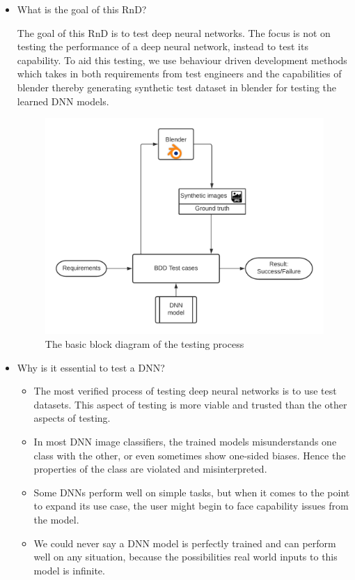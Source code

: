 \documentclass[rnd]{mas_proposal}
\begin{document}
\begin{itemize}
    \item What is the goal of this RnD?
    
    The goal of this RnD is to test deep neural networks. The focus is not on testing the performance of a deep neural network, instead to test its capability. To aid this testing, we use behaviour driven development methods which takes in both requirements from test engineers and the capabilities of blender thereby generating synthetic test dataset in blender for testing the learned DNN models.
    
    \begin{figure}[h!]
        \centering
        \includegraphics[scale=0.8]{images/basic block.png}
        \caption{The basic block diagram of the testing process}
        \label{fig:basic_block_diagram}
    \end{figure}
    
    \item Why is it essential to test a DNN?
    
    \begin{itemize}
        \item The most verified process of testing deep neural networks is to use test datasets. This aspect of testing is more viable and trusted than the other aspects of testing.
        \item In most DNN image classifiers, the trained models misunderstands one class with the other, or even sometimes show one-sided biases. Hence the properties of the class are violated and misinterpreted.
        \item Some DNNs perform well on simple tasks, but when it comes to the point to expand its use case, the user might begin to face capability issues from the model.
        \item We could never say a DNN model is perfectly trained and can perform well on any situation, because the possibilities real world inputs to this model is infinite.
    \end{itemize}
    

\end{itemize}
\end{document}
